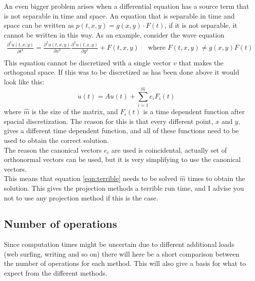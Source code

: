 An even bigger problem arises when a differential equation has a source term that is not separable in time and space. An equation that is separable in time and space can be written as $p(t,x,y) = g(x,y) \cdot F(t)$, if it is not separable, it cannot be written in this way. As an example, consider the wave equation
\begin{equation}
\begin{aligned}
\frac{\partial^2 u(t,x,y)}{\partial t^2} = \frac{\partial^2 u(t,x,y)}{\partial x^2 } \frac{\partial^2 u(t,x,y)}{\partial y^2 } + F(t,x,y) \quad \text{ where } F(t,x,y) \neq g(x,y) F(t) \\
\end{aligned}
\end{equation}
This equation cannot be discretized with a single vector $v$ that makes the orthogonal space. If this was to be discretized as has been done above it would look like this:
\begin{equation} \label{eqn:terrible}
\dot{u}(t) = A u(t) + \sum \limits_{i = 1}^{\hat{m}} e_i F_i(t)
\end{equation}
where $\hat{m}$ is the size of the matrix, and $F_i(t)$ is a time dependent function after spacial discretization. The reason for this is that every different point, $x$ and $y$, gives a different time dependent function, and all of these functions need to be used to obtain the correct solution. \\
The reason the canonical vectors $e_i$ are used is coincidental, actually set of orthonormal vectors can be used, but it is very simplifying to use the canonical vectors. \\
This means that equation \eqref{eqn:terrible} needs to be solved $\hat{m}$ times to obtain the solution. This gives the projection methods a terrible run time, and I advise you not to use any projection method if this is the case.


\subsection{Number of operations}%
Since computation times might be uncertain due to different additional loads (web surfing, writing and so on) there will here be a short comparison between the number of operations for each method. This will also give a basis for what to expect from the different methods.\\

